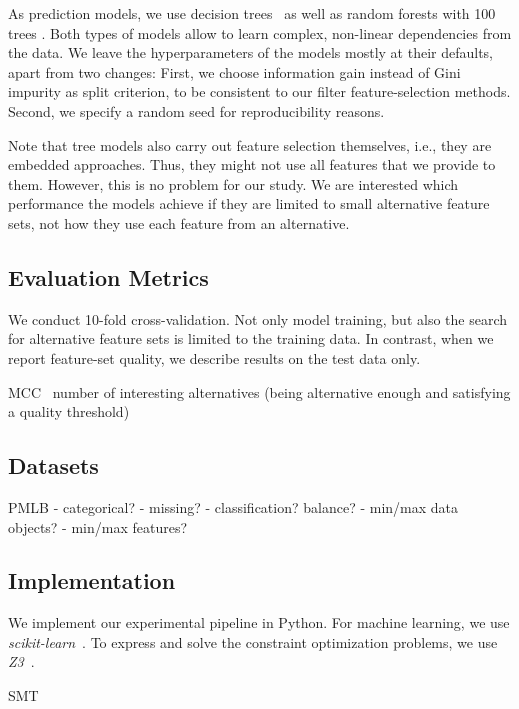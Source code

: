\documentclass{article}
\theoremstyle{definition}
\begin{document}
As prediction models, we use decision trees~\cite{breiman1984classification} as well as random forests with 100 trees \cite{breiman2001random}.
Both types of models allow to learn complex, non-linear dependencies from the data.
We leave the hyperparameters of the models mostly at their defaults, apart from two changes:
First, we choose information gain instead of Gini impurity as split criterion, to be consistent to our filter feature-selection methods.
Second, we specify a random seed for reproducibility reasons.

Note that tree models also carry out feature selection themselves, i.e., they are embedded approaches.
Thus, they might not use all features that we provide to them.
However, this is no problem for our study.
We are interested which performance the models achieve if they are limited to small alternative feature sets, not how they use each feature from an alternative.

\subsection{Evaluation Metrics}

We conduct 10-fold cross-validation.
Not only model training, but also the search for alternative feature sets is limited to the training data.
In contrast, when we report feature-set quality, we describe results on the test data only.

MCC~\cite{matthews1975comparison}
number of interesting alternatives (being alternative enough and satisfying a quality threshold)

\subsection{Datasets}

PMLB \cite{olson2017pmlb,romano2021pmlb}
- categorical?
- missing?
- classification? balance?
- min/max data objects?
- min/max features?

\subsection{Implementation}

We implement our experimental pipeline in Python.
For machine learning, we use \emph{scikit-learn}~\cite{pedregosa2011scikit-learn}.
To express and solve the constraint optimization problems, we use \emph{Z3}~\cite{deMoura2008z3}.

SMT \cite{barrett2018satisfiability}
\end{document}
